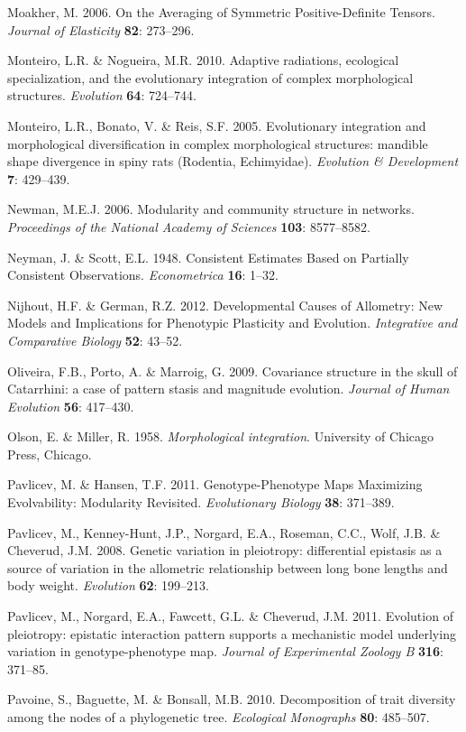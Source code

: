 \documentclass[12pt,twoside]{report}
\begin{document}
Moakher, M. 2006. On the Averaging of Symmetric Positive-Definite
Tensors. \emph{Journal of Elasticity} \textbf{82}: 273--296.

Monteiro, L.R. \& Nogueira, M.R. 2010. Adaptive radiations, ecological
specialization, and the evolutionary integration of complex
morphological structures. \emph{Evolution} \textbf{64}: 724--744.

Monteiro, L.R., Bonato, V. \& Reis, S.F. 2005. Evolutionary integration
and morphological diversification in complex morphological structures:
mandible shape divergence in spiny rats (Rodentia, Echimyidae).
\emph{Evolution \& Development} \textbf{7}: 429--439.

Newman, M.E.J. 2006. Modularity and community structure in networks.
\emph{Proceedings of the National Academy of Sciences} \textbf{103}:
8577--8582.

Neyman, J. \& Scott, E.L. 1948. Consistent Estimates Based on Partially
Consistent Observations. \emph{Econometrica} \textbf{16}: 1--32.

Nijhout, H.F. \& German, R.Z. 2012. Developmental Causes of Allometry:
New Models and Implications for Phenotypic Plasticity and Evolution.
\emph{Integrative and Comparative Biology} \textbf{52}: 43--52.

Oliveira, F.B., Porto, A. \& Marroig, G. 2009. Covariance structure in
the skull of Catarrhini: a case of pattern stasis and magnitude
evolution. \emph{Journal of Human Evolution} \textbf{56}: 417--430.

Olson, E. \& Miller, R. 1958. \emph{Morphological integration}.
University of Chicago Press, Chicago.

Pavlicev, M. \& Hansen, T.F. 2011. Genotype-Phenotype Maps Maximizing
Evolvability: Modularity Revisited. \emph{Evolutionary Biology}
\textbf{38}: 371--389.

Pavlicev, M., Kenney-Hunt, J.P., Norgard, E.A., Roseman, C.C., Wolf,
J.B. \& Cheverud, J.M. 2008. Genetic variation in pleiotropy:
differential epistasis as a source of variation in the allometric
relationship between long bone lengths and body weight. \emph{Evolution}
\textbf{62}: 199--213.

Pavlicev, M., Norgard, E.A., Fawcett, G.L. \& Cheverud, J.M. 2011.
Evolution of pleiotropy: epistatic interaction pattern supports a
mechanistic model underlying variation in genotype-phenotype map.
\emph{Journal of Experimental Zoology B} \textbf{316}: 371--85.

Pavoine, S., Baguette, M. \& Bonsall, M.B. 2010. Decomposition of trait
diversity among the nodes of a phylogenetic tree. \emph{Ecological
Monographs} \textbf{80}: 485--507.
\end{document}
